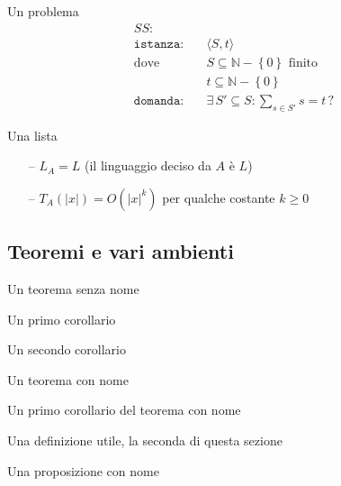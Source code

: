 Un problema
\begin{align*}
    SS: & \\
    \texttt{istanza:} \quad &
    \langle
        S,t
    \rangle
    \\
    \text{dove} \quad &
    S \subseteq \mathbb{N} - \left\{ 0 \right\} \text{ finito}
    \\
    &
    t \subseteq \mathbb{N} - \left\{ 0 \right\} \\
    \texttt{domanda:} \quad &
    \exists \, S' \subseteq S : \sum_{s \in S'}^{} s = t \, ?
\end{align*}

Una lista
\begin{itemize}[noitemsep,parsep=0pt,partopsep=0pt,topsep=0pt]
    \item[--] $L_A = L$ (il linguaggio deciso da $A$ è $L$)
    \item[--] $T_A(|x|) = O(|x|^k)$ per qualche costante $k \geq 0$
\end{itemize}

\subsection{ Teoremi e vari ambienti }

\begin{theorem}
    Un teorema senza nome
\end{theorem}

\begin{corollario}
    Un primo corollario
\end{corollario}

\begin{corollario}
    Un secondo corollario
\end{corollario}

\begin{theorem}
    Un teorema con nome
\end{theorem}

\begin{corollario}
    Un primo corollario del teorema con nome
\end{corollario}

\begin{definition}
    Una definizione utile, la seconda di questa sezione
\end{definition}

\begin{proposizione}
    Una proposizione con nome
\end{proposizione}


